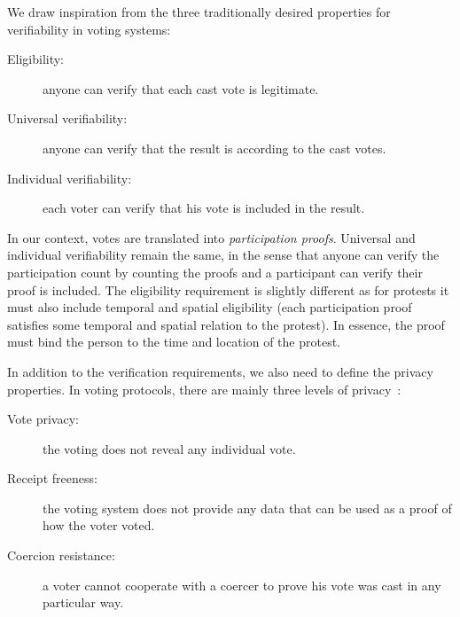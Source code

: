 We draw inspiration from the three traditionally desired properties for verifiability in voting systems:
\begin{description}
  \item[Eligibility:] anyone can verify that each cast vote is legitimate.
  \item[Universal verifiability:] anyone can verify that the result is according to the cast votes.
  \item[Individual verifiability:] each voter can verify that his vote is included in the result.
\end{description}
In our context, votes are translated into \emph{participation proofs}.
Universal and individual verifiability remain the same, in the sense that anyone can verify the participation count by counting the proofs and a participant can verify their proof is included.
The eligibility requirement is slightly different as for protests it must also
include temporal%
and spatial eligibility (\ie each participation proof satisfies some temporal 
and spatial relation to the protest).
In essence, the proof must bind the person to the time and location of the protest.

In addition to the verification requirements, we also need to define the 
privacy properties.
In voting protocols, there are mainly three levels of privacy~\cite{VerifyingPrivacyPropertiesOfVotingProtocols}:
\begin{description}
  \item[Vote privacy:] the voting does not reveal any individual vote.
  \item[Receipt freeness:] the voting system does not provide any data that can be used as a proof of how the voter voted.
  \item[Coercion resistance:] a voter cannot cooperate with a coercer to prove his vote was cast in any particular way.
\end{description}

